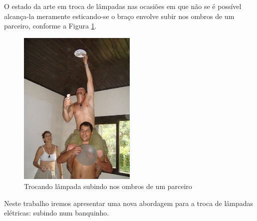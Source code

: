 O estado da arte em troca de lâmpadas nas ocasiões em que não se é possível
alcança-la meramente esticando-se o braço envolve subir nos ombros de um parceiro,
conforme a Figura \ref{fig:ombros}.

\begin{figure}[!htb]
  \centering
  \includegraphics[width=0.5\textwidth]{ombros.jpg}
  \caption{Trocando lâmpada subindo nos ombros de um parceiro}
  \label{fig:ombros}
\end{figure}


Neste trabalho iremos apresentar uma nova abordagem
para a troca de lâmpadas elétricas:
subindo num banquinho. %

